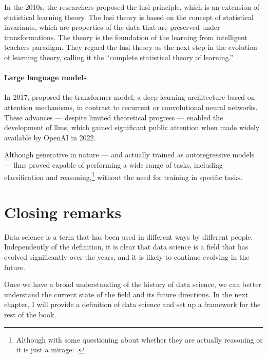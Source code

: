 In the 2010s, the researchers \textcite{Vapnik2015} proposed the \gls{lusi}
principle, which is an extension of statistical learning theory.  The \gls{lusi}
theory is based on the concept of statistical invariants, which are properties of
the data that are preserved under transformations.  The theory is the foundation of the
learning from intelligent teachers paradigm.  They regard the \gls{lusi} theory as the
next step in the evolution of learning theory, calling it the ``complete statistical
theory of learning.''

\paragraph{Large language models}

In 2017, \citeauthor{Vaswani2017} proposed the
\gls{transformer} model, a deep learning architecture based on attention mechanisms, in
contrast to recurrent or convolutional neural networks. These
advances --- despite limited theoretical progress --- enabled the development of \glspl{llm},
which gained significant public attention when made widely available by OpenAI in 2022.

Although generative in nature --- and actually trained as autoregressive models ---
\glspl{llm} proved capable of performing a wide range of tasks, including classification
and reasoning,\footnote{Although with some questioning about whether they are actually
reasoning or it is just a mirage: .} without the need for
training in specific tasks.

\section{Closing remarks}

Data science is a term that has been used in different ways by different people.
Independently of the definition, it is clear that data science is a field that has evolved
significantly over the years, and it is likely to continue evolving in the future.

Once we have a broad understanding of the history of data science, we can better
understand the current state of the field and its future directions.  In the next chapter,
I will provide a definition of data science and set up a framework for the rest of the
book.

